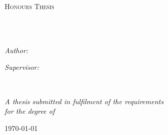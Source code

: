 \documentclass[
12pt, %
oneside, %
english, %
onehalfspacing, %
liststotoc, %
headsepline, %
consistentlayout, %
]{MastersDoctoralThesis} %
\author{Alastair \textsc{Wiegelmann}} %
\begin{document}
\frontmatter %

\pagestyle{plain} %


\begin{titlepage}
\begin{center}

\vspace*{.06\textheight}
{\scshape\LARGE \univname\par}\vspace{1.5cm} %
\textsc{\Large Honours Thesis}\\[0.5cm] %

\HRule \\[0.4cm] %
{\huge \bfseries \ttitle\par}\vspace{0.4cm} %
\HRule \\[1.5cm] %
 
\begin{minipage}[t]{0.4\textwidth}
\begin{flushleft} \large
\emph{Author:}\\
{\authorname} %
\end{flushleft}
\end{minipage}
\begin{minipage}[t]{0.4\textwidth}
\begin{flushright} \large
\emph{Supervisor:} \\
{\supname} %
\end{flushright}
\end{minipage}\\[3cm]
 
\vfill

\large \textit{A thesis submitted in fulfilment of the requirements\\ for the degree of \degreename}\\[0.3cm] %
 
\vfill

{\large \today}\\[4cm] %
 
\vfill
\end{center}
\end{titlepage}
\end{document}
